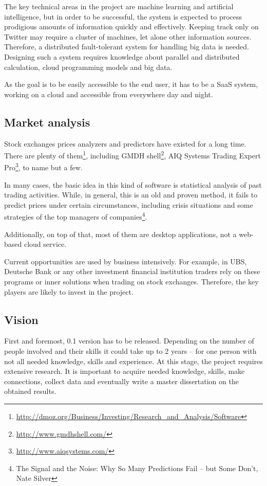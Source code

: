 \documentclass[a4paper,12pt]{article}
\begin{document}
The key technical areas in the project are machine learning and artificial intelligence, but in order to be successful, the system is expected to process prodigious amounts of information quickly and effectively. Keeping track only on Twitter may require a cluster of machines, let alone other information sources. Therefore, a distributed fault-tolerant system for handling big data is needed. Designing such a system requires knowledge about parallel and distributed calculation, cloud programming models and big data.

As the goal is to be easily accessible to the end user, it has to be a SaaS system, working on a cloud and accessible from everywhere day and night.

\subsection*{Market analysis}

Stock exchanges prices analyzers and predictors have existed for a long time. There are plenty of them\footnote{\url{http://dmoz.org/Business/Investing/Research\_and\_Analysis/Software}}, including GMDH shell\footnote{\url{http://www.gmdhshell.com/}}, AIQ Systems Trading Expert Pro\footnote{\url{http://www.aiqsystems.com/}}, to name but a few.

In many cases, the basic idea in this kind of software is statistical analysis of past trading activities. While, in general, this is an old and proven method, it fails to predict prices under certain circumstances, including crisis situations and some strategies of the top managers of companies\footnote{The Signal and the Noise: Why So Many Predictions Fail -- but Some Don't, Nate Silver}.

Additionally, on top of that, most of them are desktop applications, not a web-based cloud service.

Current opportunities are used by business intensively. For example, in UBS, Deutsche Bank or any other investment financial institution traders rely on these programs or inner solutions when trading on stock exchanges. Therefore, the key players are likely to invest in the project.

\subsection*{Vision}

First and foremost, 0.1 version has to be released. Depending on the number of people involved and their skills it could take up to 2 years -- for one person with not all needed knowledge, skills and experience. At this stage, the project requires extensive research. It is important to acquire needed knowledge, skills, make connections, collect data and eventually write a master dissertation on the obtained results.
\end{document}
